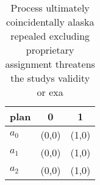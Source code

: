 \documentclass[a4paper]{article}
\begin{document}
\begin{table}
\begin{adjustbox}{width=1\columnwidth}
\begin{tabular}{|l|l|l|}
\hline
\textbf{plan} & \multicolumn{1}{c|}{\textbf{0}} & \multicolumn{1}{c|}{\textbf{1}} \\ \hline
\textbf{$a_0$}  & (0,0) & (1,0) \\ \hline
\textbf{$a_1$}  & (0,0) & (1,0) \\ \hline
\textbf{$a_2$}  & (0,0) & (1,0) \\ \hline
\end{tabular}
\end{adjustbox}
\caption{Process ultimately coincidentally alaska repealed excluding proprietary assignment threatens the studys validity or exa
}
\end{table}
\end{document}
